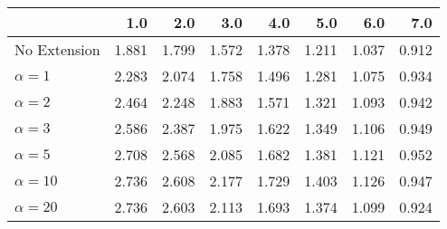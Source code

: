\begin{tabular}{lrrrrrrr}
\toprule
{} &   1.0 &   2.0 &   3.0 &   4.0 &   5.0 &   6.0 &   7.0 \\
\midrule
No Extension  & 1.881 & 1.799 & 1.572 & 1.378 & 1.211 & 1.037 & 0.912 \\
$\alpha = 1$  & 2.283 & 2.074 & 1.758 & 1.496 & 1.281 & 1.075 & 0.934 \\
$\alpha = 2$  & 2.464 & 2.248 & 1.883 & 1.571 & 1.321 & 1.093 & 0.942 \\
$\alpha = 3$  & 2.586 & 2.387 & 1.975 & 1.622 & 1.349 & 1.106 & 0.949 \\
$\alpha = 5$  & 2.708 & 2.568 & 2.085 & 1.682 & 1.381 & 1.121 & 0.952 \\
$\alpha = 10$ & 2.736 & 2.608 & 2.177 & 1.729 & 1.403 & 1.126 & 0.947 \\
$\alpha = 20$ & 2.736 & 2.603 & 2.113 & 1.693 & 1.374 & 1.099 & 0.924 \\
\bottomrule
\end{tabular}
